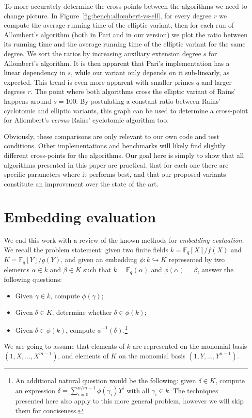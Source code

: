 \documentclass[12pt]{article}
\theoremstyle{plain}
\theoremstyle{definition}
\def\F{\ensuremath{\mathbb{F}}}
\newcounter{algorithm}
\begin{document}
To more accurately determine the cross-points between the algorithms
we need to change picture. In Figure~\ref{fig:bench:allombert-vs-ell},
for every degree $r$ we compute the average running time of the
elliptic variant, then for each run of Allombert's algorithm (both in
Pari and in our version) we plot the ratio between its running time
and the average running time of the elliptic variant for the same
degree. We sort the ratios by increasing auxiliary extension degree
$s$ for Allombert's algorithm. It is then apparent that Pari's
implementation has a linear dependency in $s$, while our variant only
depends on it sub-linearly, as expected. This trend is even more
apparent with smaller primes $q$ and larger degrees $r$. The point
where both algorithms cross the elliptic variant of Rains' happens
around $s=100$. By postulating a constant ratio between Rains'
cyclotomic and elliptic variants, this graph can be used to determine
a cross-point for Allombert's \emph{versus} Rains' cyclotomic
algorithm too.

Obviously, these comparisons are only relevant to our own code and
test conditions. Other implementations and benchmarks will likely find
slightly different cross-points for the algorithms. Our goal here is
simply to show that all algorithms presented in this paper are
practical, that for each one there are specific parameters where it
performs best, and that our proposed variants constitute an
improvement over the state of the art.



\section{Embedding evaluation}
\label{sec:eval}

We end this work with a review of the known methods for
\emph{embedding evaluation}. %
We recall the problem statement: given two finite fields
$k=\F_q[X]/f(X)$ and $K=\F_q[Y]/g(Y)$, and given an embedding
$\phi:k\hookrightarrow K$ represented by two elements $\alpha\in k$
and $\beta\in K$ such that $k=\F_q(\alpha)$ and $\phi(\alpha)=\beta$,
answer the following questions:
\begin{itemize}
\item Given $\gamma\in k$, compute $\phi(\gamma)$;
\item Given $\delta\in K$, determine whether $\delta\in\phi(k)$;
\item Given $\delta\in\phi(k)$, compute
  $\phi^{-1}(\delta)$.\footnote{An additional natural question would
    be the following: given $\delta\in K$, compute an expression
    $\delta=\sum_{i=0}^{n/m-1} \phi(\gamma_i) Y^i$ with all
    $\gamma_i\in k$. The techniques presented here also apply to this
    more general problem, however we will skip them for conciseness.}
\end{itemize}
We are going to assume that elements of $k$ are represented on the
monomial basis $(1,X,\dots,X^{m-1})$, and elements of $K$ on the
monomial basis $(1,Y,\dots,Y^{n-1})$.
\end{document}
